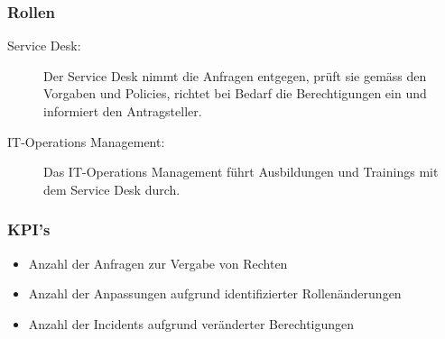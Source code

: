 \subsubsection{Rollen}

\begin{description}
	\item[Service Desk:] Der Service Desk nimmt die Anfragen entgegen, prüft sie gemäss den Vorgaben und Policies, richtet bei Bedarf die Berechtigungen ein und informiert den Antragsteller.
	\item[IT-Operations Management:] Das IT-Operations Management führt Ausbildungen und Trainings mit dem Service Desk durch.
\end{description}

\subsubsection{KPI's}

\begin{itemize}
	\item Anzahl der Anfragen zur Vergabe von Rechten
	\item Anzahl der Anpassungen aufgrund identifizierter Rollenänderungen
	\item Anzahl der Incidents aufgrund veränderter Berechtigungen
\end{itemize}
